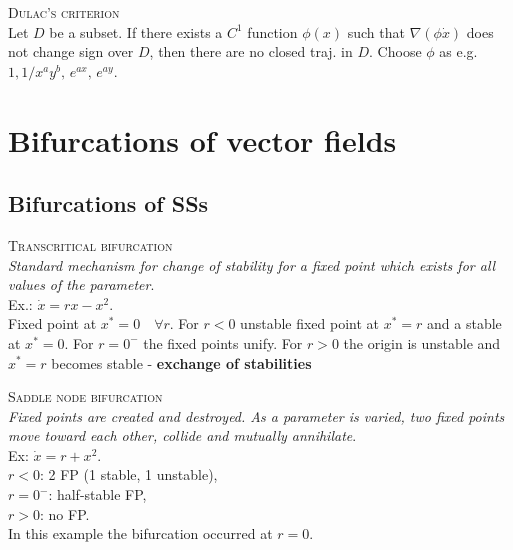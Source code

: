 \textsc{Dulac's criterion}\\
Let $D$ be a subset. If there exists a $C^1$ function $\phi(x)$ such that $\nabla(\phi\dot{x})$ does not change sign over $D$, then there are no closed traj. in $D$. Choose $\phi$ as e.g. $1, 1/x^ay^b,\, e^{ax},\,e^{ay}$.

\section{Bifurcations of vector fields}
\subsection{Bifurcations of SSs}
\textsc{Transcritical bifurcation}\\
\emph{Standard mechanism for change of stability for a fixed point which exists for all values of the parameter}.\\
Ex.: $\dot{x}=rx-x^2$.\\
Fixed point at $x^*=0 \quad \forall r$. For $r<0$ unstable fixed point at $x^*=r$ and a stable at $x^*=0$. For $r=0^-$ the fixed points unify. For $r>0$ the origin is unstable and $x^*=r$ becomes stable - \textbf{exchange of stabilities}
\begin{center}
\end{center}
\vspace{0.2cm}


\textsc{Saddle node bifurcation}\\
\emph{Fixed points are created and destroyed. As a parameter is varied, two fixed points move toward each other, collide and mutually annihilate}.\\
Ex: $\dot{x}=r+x^2$.\\ $r<0$: 2 FP (1 stable, 1 unstable),\\ $r=0^-$: half-stable FP, \\ $r>0$: no FP.\\ In this example the bifurcation occurred at $r=0$.
\begin{center}
\end{center}
\vspace{0.2cm}

